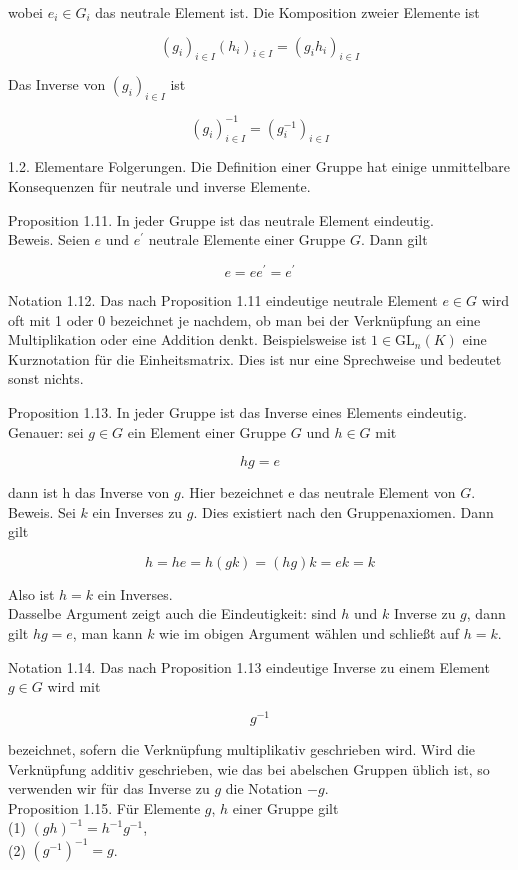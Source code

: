 \documentclass[10pt, letterpaper]{article}
\begin{document}
wobei $e_{i} \in G_{i}$ das neutrale Element ist. Die Komposition zweier Elemente ist

$$
\left(g_{i}\right)_{i \in I}\left(h_{i}\right)_{i \in I}=\left(g_{i} h_{i}\right)_{i \in I}
$$

Das Inverse von $\left(g_{i}\right)_{i \in I}$ ist

$$
\left(g_{i}\right)_{i \in I}^{-1}=\left(g_{i}^{-1}\right)_{i \in I}
$$

1.2. Elementare Folgerungen. Die Definition einer Gruppe hat einige unmittelbare Konsequenzen für neutrale und inverse Elemente.

Proposition 1.11. In jeder Gruppe ist das neutrale Element eindeutig.\\
Beweis. Seien $e$ und $e^{\prime}$ neutrale Elemente einer Gruppe $G$. Dann gilt

$$
e=e e^{\prime}=e^{\prime}
$$

Notation 1.12. Das nach Proposition 1.11 eindeutige neutrale Element $e \in G$ wird oft mit 1 oder 0 bezeichnet je nachdem, ob man bei der Verknüpfung an eine Multiplikation oder eine Addition denkt. Beispielsweise ist $1 \in \mathrm{GL}_{n}(K)$ eine Kurznotation für die Einheitsmatrix. Dies ist nur eine Sprechweise und bedeutet sonst nichts.

Proposition 1.13. In jeder Gruppe ist das Inverse eines Elements eindeutig.\\
Genauer: sei $g \in G$ ein Element einer Gruppe $G$ und $h \in G$ mit

$$
h g=e
$$

dann ist h das Inverse von $g$. Hier bezeichnet e das neutrale Element von $G$.\\
Beweis. Sei $k$ ein Inverses zu $g$. Dies existiert nach den Gruppenaxiomen. Dann gilt

$$
h=h e=h(g k)=(h g) k=e k=k
$$

Also ist $h=k$ ein Inverses.\\
Dasselbe Argument zeigt auch die Eindeutigkeit: sind $h$ und $k$ Inverse zu $g$, dann gilt $h g=e$, man kann $k$ wie im obigen Argument wählen und schließt auf $h=k$.

Notation 1.14. Das nach Proposition 1.13 eindeutige Inverse zu einem Element $g \in G$ wird mit

$$
g^{-1}
$$

bezeichnet, sofern die Verknüpfung multiplikativ geschrieben wird. Wird die Verknüpfung additiv geschrieben, wie das bei abelschen Gruppen üblich ist, so verwenden wir für das Inverse zu $g$ die Notation $-g$.\\
Proposition 1.15. Für Elemente $g$, $h$ einer Gruppe gilt\\
(1) $(g h)^{-1}=h^{-1} g^{-1}$,\\
(2) $\left(g^{-1}\right)^{-1}=g$.
\end{document}
